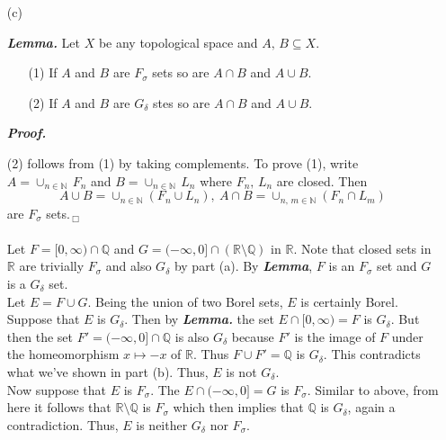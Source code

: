 \documentclass[a4paper,11pt]{article}
\begin{document}
\begin{enumerate}
	But by Baire Category Theorem, $\mathbb{R}^d$ is a Baire space, hence $\mathbb{R}^d$ has empty interior, nonsense. Therefore, $F$ is not $G_\delta$.\\

	\item [(c)]

	\textit{\textbf{Lemma.}} Let $X$ be any topological space and $A,\, B \subseteq X$.
	\begin{enumerate}
		\item [(1)] If $A$ and $B$ are $F_\sigma$ sets so are $A \cap B$ and $A \cup B$.

	 	\item [(2)] If $A$ and $B$ are $G_\delta$ stes so are $A \cap B$ and $A \cup B$.
	\end{enumerate}

	\textit{\textbf{Proof.}}

	(2) follows from (1) by taking complements. To prove (1), write $A = \cup_{n \in \mathbb{N}}\,F_n$ and $B = \cup_{n \in \mathbb{N}}\,L_n$ where $F_n,\,L_n$ are closed. Then
		$$A \cup B
		= \cup_{n \in \mathbb{N}} (F_n \cup L_n),\
		A \cap B = \cup_{n,\,m \in \mathbb{N}} (F_n \cap L_m)$$
	are $F_\sigma$ sets.\,$_\Box$\\\\

	Let $F = [0,\infty) \cap \mathbb{Q}$ and $G = (-\infty,0] \cap (\mathbb{R} \setminus \mathbb{Q})$ in $\mathbb{R}$. Note that closed sets in $\mathbb{R}$ are trivially $F_\sigma$ and also $G_\delta$ by part (a). By \textit{\textbf{Lemma}}, $F$ is an $F_\sigma$ set and $G$ is a $G_\delta$ set.\\

	Let $E = F \cup G$. Being the union of two Borel sets, $E$ is certainly Borel. Suppose that $E$ is $G_\delta$. Then by \textit{\textbf{Lemma.}} the set $E \cap [0,\infty) = F$ is $G_\delta$. But then the set $F' = (-\infty,0] \cap \mathbb{Q}$ is also $G_\delta$ because $F'$ is the image of $F$ under the homeomorphism $x \mapsto -x$ of $\mathbb{R}$. Thus $F \cup F' = \mathbb{Q}$ is $G_\delta$. This contradicts what we've shown in part (b). Thus, $E$ is not $G_\delta$.\\

	Now suppose that $E$ is $F_\sigma$. The $E \cap (-\infty,0] = G$ is $F_\sigma$. Similar to above, from here it follows that $\mathbb{R} \setminus \mathbb{Q}$ is $F_\sigma$ which then implies that $\mathbb{Q}$ is $G_\delta$, again a contradiction. Thus, $E$ is neither $G_\delta$ nor $F_\sigma$.\\\\
\end{enumerate}
\end{document}

